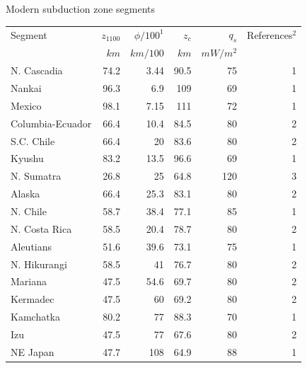 \documentclass[draft]{agujournal2019}
\begin{document}
\begin{threeparttable}
 \caption{Modern subduction zone segments}
 \label{Table4}
 \begin{tabularx}{\textwidth}{L{2} R{0.5} R{0.5} R{0.5} R{0.5} R{0.5}}

  \toprule

  Segment          & $z_{1100}$ & $\phi/100^1$ & $z_c$ & $q_s$    & References$^2$ \\

                   & $km$       & $km/100$     & $km$  & $mW/m^2$                  \\

  \midrule

  N. Cascadia      & 74.2       & 3.44         & 90.5  & 75       & 1              \\
  Nankai           & 96.3       & 6.9          & 109   & 69       & 1              \\
  Mexico           & 98.1       & 7.15         & 111   & 72       & 1
  \\
  Columbia-Ecuador & 66.4       & 10.4         & 84.5  & 80       & 2              \\
  S.C. Chile       & 66.4       & 20           & 83.6  & 80       & 2
  \\
  Kyushu           & 83.2       & 13.5         & 96.6  & 69       & 1
  \\
  N. Sumatra       & 26.8       & 25           & 64.8  & 120      & 3
  \\
  Alaska           & 66.4       & 25.3         & 83.1  & 80       & 2
  \\
  N. Chile         & 58.7       & 38.4         & 77.1  & 85       & 1
  \\
  N. Costa Rica    & 58.5       & 20.4         & 78.7  & 80       & 2
  \\
  Aleutians        & 51.6       & 39.6         & 73.1  & 75       & 1
  \\
  N. Hikurangi     & 58.5       & 41           & 76.7  & 80       & 2
  \\
  Mariana          & 47.5       & 54.6         & 69.7  & 80       & 2
  \\
  Kermadec         & 47.5       & 60           & 69.2  & 80       & 2
  \\
  Kamchatka        & 80.2       & 77           & 88.3  & 70       & 1
  \\
  Izu              & 47.5       & 77           & 67.6  & 80       & 2
  \\
  NE Japan         & 47.7       & 108          & 64.9  & 88       & 1
  \\


\end{tabularx}
\end{threeparttable}
\end{document}
